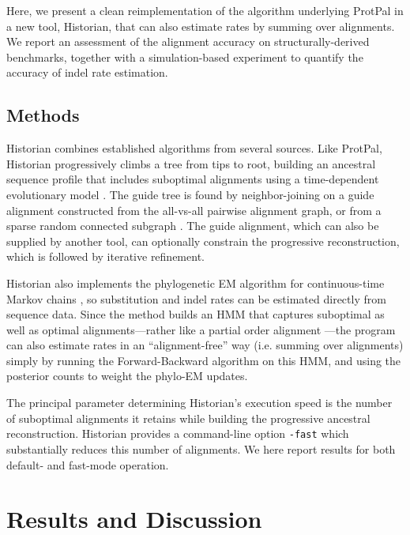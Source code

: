 \documentclass{bioinfo}
\begin{document}
Here, we present a clean reimplementation of the algorithm underlying ProtPal
in a new tool, Historian, that can also estimate rates by summing over alignments.
We report an assessment of the alignment accuracy
on structurally-derived benchmarks,
together with a simulation-based experiment to quantify the accuracy of indel rate estimation.

\begin{methods}
\section{Methods}

Historian combines established algorithms from several sources.
Like ProtPal, Historian progressively climbs a tree from tips to root,
building an ancestral sequence profile that includes suboptimal alignments \citep{LeeGrassoSharlow2002,Westesson2012-zg}
using a time-dependent evolutionary model \citep{RivasEddy2015}.
The guide tree is found by neighbor-joining %
on a guide alignment constructed from the all-vs-all pairwise alignment graph,
or from a sparse random connected subgraph \citep{BradleyEtAl2009}.
The guide alignment, which can also be supplied by another tool,
can optionally constrain the progressive reconstruction,
which is followed by iterative refinement. %

Historian also implements the phylogenetic EM algorithm for continuous-time Markov chains \citep{HolmesRubin2002},
so substitution and indel rates can be estimated directly from sequence data.
Since the method builds an HMM that captures suboptimal as well as optimal alignments---rather
like a partial order alignment \citep{LeeGrassoSharlow2002}---the program
can also estimate rates in an ``alignment-free'' way (i.e. summing over alignments)
simply by running the Forward-Backward algorithm on this HMM,
and using the posterior counts to weight the phylo-EM updates.

The principal parameter determining Historian's execution speed is the number of suboptimal alignments
it retains while building the progressive ancestral reconstruction. Historian provides a command-line option {\tt -fast} which substantially reduces this number of alignments.
We here report results for both default- and fast-mode operation.

\end{methods}

\section{Results and Discussion}
\end{document}
